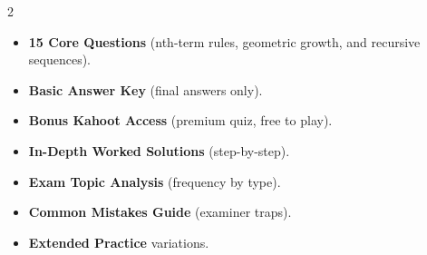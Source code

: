 \documentclass[11pt,a4paper]{article}
\newcommand{\FullReleaseDate}{April 30, 2026}
\begin{document}
\vspace{8pt}

\begin{multicols}{2}
  \begin{tcolorbox}[card, title=\sffamily\bfseries\textcolor{white}{\faHandPointDown\ TODAY (Simplified Version)}, colbacktitle=mainblue, boxed title style={sharp corners, boxrule=0pt}]
    \begin{itemize}[leftmargin=1.2em, itemsep=2pt]
      \item \small \textbf{15 Core Questions} (nth-term rules, geometric growth, and recursive sequences).
      \item \small \textbf{Basic Answer Key} (final answers only).
      \item \small \textbf{Bonus Kahoot Access} (premium quiz, free to play).
    \end{itemize}
  \end{tcolorbox}

  \columnbreak

  \begin{tcolorbox}[card, title=\sffamily\bfseries\textcolor{white}{\faRocket\ ON \FullReleaseDate\ (Full Upgrade)}, colbacktitle=mainblue, boxed title style={sharp corners, boxrule=0pt}]
    \begin{itemize}[leftmargin=1.2em, itemsep=2pt]
      \item \small \textbf{In-Depth Worked Solutions} (step-by-step).
      \item \small \textbf{Exam Topic Analysis} (frequency by type).
      \item \small \textbf{Common Mistakes Guide} (examiner traps).
      \item \small \textbf{Extended Practice} variations.
    \end{itemize}
  \end{tcolorbox}
\end{multicols}
\end{document}
